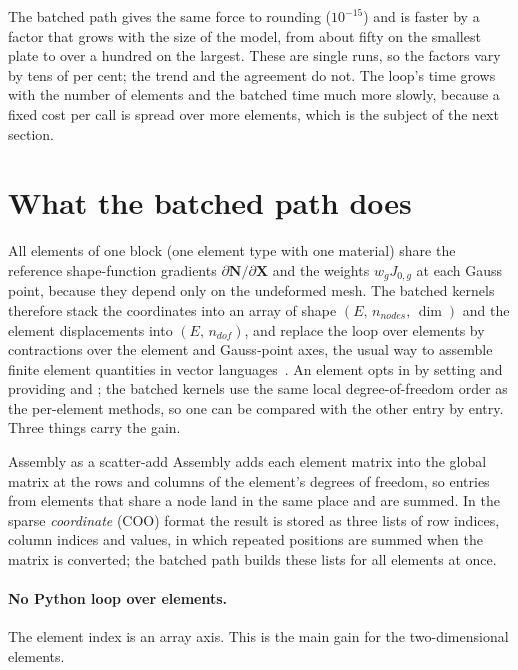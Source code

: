 The batched path gives the same force to rounding ($10^{-15}$) and is faster by a factor that grows with the size of the model, from about fifty on the smallest plate to over a hundred on the largest. These are single runs, so the factors vary by tens of per cent; the trend and the agreement do not. The loop's time grows with the number of elements and the batched time much more slowly, because a fixed cost per call is spread over more elements, which is the subject of the next section.

\section{What the batched path does}\label{sec:bk-idea}

All elements of one block (one element type with one material) share the reference shape-function gradients $\partial\bm N/\partial\bm X$ and the weights $w_gJ_{0,g}$ at each Gauss point, because they depend only on the undeformed mesh. The batched kernels therefore stack the coordinates into an array of shape $(E,\,n_{nodes},\,\dim)$ and the element displacements into $(E,\,n_{dof})$, and replace the loop over elements by contractions over the element and Gauss-point axes, the usual way to assemble finite element quantities in vector languages~\cite{cuvelier2014assemble}. An element opts in by setting  and providing  and ; the batched kernels use the same local degree-of-freedom order as the per-element methods, so one can be compared with the other entry by entry. Three things carry the gain.

\begin{sidenote}{Assembly as a scatter-add}
Assembly adds each element matrix into the global matrix at the rows and columns of the element's degrees of freedom, so entries from elements that share a node land in the same place and are summed. In the sparse \emph{coordinate} (COO) format the result is stored as three lists of row indices, column indices and values, in which repeated positions are summed when the matrix is converted; the batched path builds these lists for all elements at once.
\end{sidenote}

\paragraph{No Python loop over elements.} The element index is an array axis. This is the main gain for the two-dimensional elements.

